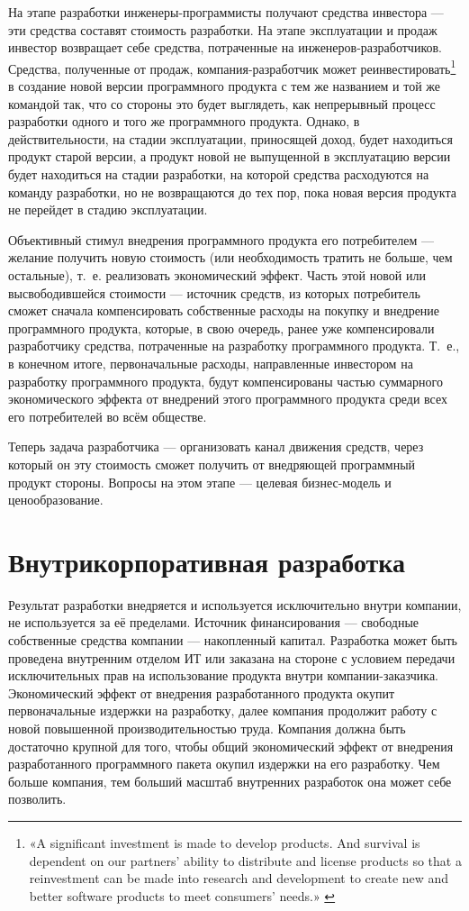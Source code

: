 \documentclass{article}
\begin{document}
На этапе разработки инженеры-программисты получают средства инвестора — эти средства составят стоимость разработки. На этапе эксплуатации и продаж инвестор возвращает себе средства, потраченные на инженеров-разработчиков. Средства, полученные от продаж, компания-разработчик может реинвестировать\footnote{«A significant investment is made to develop products. And survival is dependent on our partners’ ability to distribute and license products so that a reinvestment can be made into research and development to create new and better software products to meet consumers’ needs.» \cite{microsoftPiracyReinvest}} в создание новой версии программного продукта с тем же названием и той же командой так, что со стороны это будет выглядеть, как непрерывный процесс разработки одного и того же программного продукта. Однако, в действительности, на стадии эксплуатации, приносящей доход, будет находиться продукт старой версии, а продукт новой не выпущенной в эксплуатацию версии будет находиться на стадии разработки, на которой средства расходуются на команду разработки, но не возвращаются до тех пор, пока новая версия продукта не перейдет в стадию эксплуатации.

Объективный стимул внедрения программного продукта его потребителем — желание получить новую стоимость (или необходимость тратить не больше, чем остальные), т.~е. реализовать экономический эффект. Часть этой новой или высвободившейся стоимости — источник средств, из которых потребитель сможет сначала компенсировать собственные расходы на покупку и внедрение программного продукта, которые, в свою очередь, ранее уже компенсировали разработчику средства, потраченные на разработку программного продукта. Т.~е., в конечном итоге, первоначальные расходы, направленные инвестором на разработку программного продукта, будут компенсированы частью суммарного экономического эффекта от внедрений этого программного продукта среди всех его потребителей во всём обществе.

Теперь задача разработчика — организовать канал движения средств, через который он эту стоимость сможет получить от внедряющей программный продукт стороны. Вопросы на этом этапе — целевая бизнес-модель и ценообразование.

\section*{Внутрикорпоративная разработка}

Результат разработки внедряется и используется исключительно внутри компании, не используется за её пределами. Источник финансирования — свободные собственные средства компании — накопленный капитал. Разработка может быть проведена внутренним отделом ИТ или заказана на стороне с условием передачи исключительных прав на использование продукта внутри компании-заказчика. Экономический эффект от внедрения разработанного продукта окупит первоначальные издержки на разработку, далее компания продолжит работу с новой повышенной производительностью труда. Компания должна быть достаточно крупной для того, чтобы общий экономический эффект от внедрения разработанного программного пакета окупил издержки на его разработку. Чем больше компания, тем больший масштаб внутренних разработок она может себе позволить.
\end{document}
